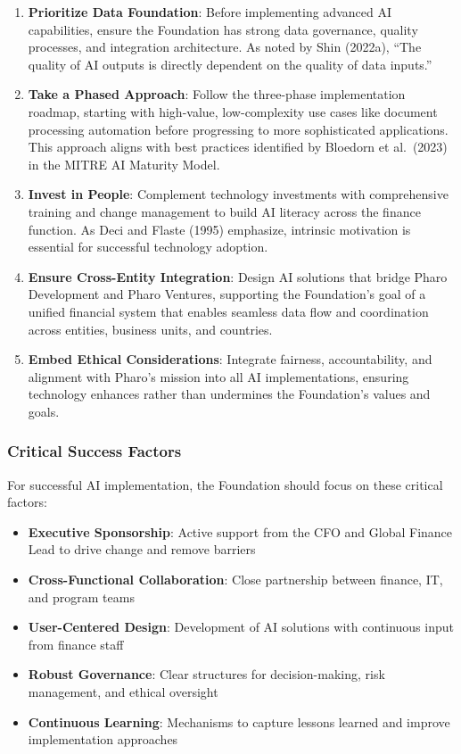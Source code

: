 \documentclass[
]{article}
\providecommand{\tightlist}{%
  \setlength{\itemsep}{0pt}\setlength{\parskip}{0pt}}\usepackage{longtable,booktabs,array}
\begin{document}
\begin{enumerate}
\def\labelenumi{\arabic{enumi}.}
\item
  \textbf{Prioritize Data Foundation}: Before implementing advanced AI
  capabilities, ensure the Foundation has strong data governance,
  quality processes, and integration architecture. As noted by Shin
  (2022a), ``The quality of AI outputs is directly dependent on the
  quality of data inputs.''
\item
  \textbf{Take a Phased Approach}: Follow the three-phase implementation
  roadmap, starting with high-value, low-complexity use cases like
  document processing automation before progressing to more
  sophisticated applications. This approach aligns with best practices
  identified by Bloedorn et al.~(2023) in the MITRE AI Maturity Model.
\item
  \textbf{Invest in People}: Complement technology investments with
  comprehensive training and change management to build AI literacy
  across the finance function. As Deci and Flaste (1995) emphasize,
  intrinsic motivation is essential for successful technology adoption.
\item
  \textbf{Ensure Cross-Entity Integration}: Design AI solutions that
  bridge Pharo Development and Pharo Ventures, supporting the
  Foundation's goal of a unified financial system that enables seamless
  data flow and coordination across entities, business units, and
  countries.
\item
  \textbf{Embed Ethical Considerations}: Integrate fairness,
  accountability, and alignment with Pharo's mission into all AI
  implementations, ensuring technology enhances rather than undermines
  the Foundation's values and goals.
\end{enumerate}

\subsubsection{Critical Success Factors}\label{critical-success-factors}

For successful AI implementation, the Foundation should focus on these
critical factors:

\begin{itemize}
\tightlist
\item
  \textbf{Executive Sponsorship}: Active support from the CFO and Global
  Finance Lead to drive change and remove barriers
\item
  \textbf{Cross-Functional Collaboration}: Close partnership between
  finance, IT, and program teams
\item
  \textbf{User-Centered Design}: Development of AI solutions with
  continuous input from finance staff
\item
  \textbf{Robust Governance}: Clear structures for decision-making, risk
  management, and ethical oversight
\item
  \textbf{Continuous Learning}: Mechanisms to capture lessons learned
  and improve implementation approaches
\end{itemize}
\end{document}
